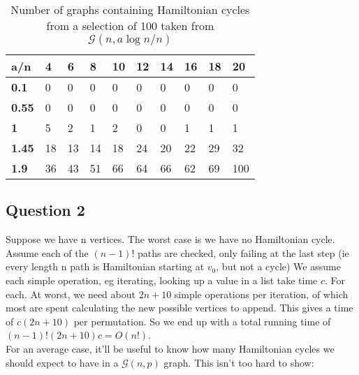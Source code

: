 \documentclass[10pt,a4paper]{report}
\begin{document}
\begin{table}[ht]
\centering
\begin{tabular}{|l|l|l|l|l|l|l|l|l|l|}
\hline
\textbf{a/n}  & \textbf{4} & \textbf{6} & \textbf{8} & \textbf{10} & \textbf{12} & \textbf{14} & \textbf{16} & \textbf{18} & \textbf{20} \\ \hline
\textbf{0.1}  & 0          & 0          & 0          & 0           & 0           & 0           & 0           & 0           & 0           \\ \hline
\textbf{0.55} & 0          & 0          & 0          & 0           & 0           & 0           & 0           & 0           & 0           \\ \hline
\textbf{1}    & 5          & 2          & 1          & 2           & 0           & 0           & 1           & 1           & 1           \\ \hline
\textbf{1.45} & 18         & 13         & 14         & 18          & 24          & 20          & 22          & 29          & 32          \\ \hline
\textbf{1.9}  & 36         & 43         & 51         & 66          & 64          & 66          & 62          & 69          & 100         \\ \hline
\end{tabular}
\caption{Number of graphs containing Hamiltonian cycles from a selection of 100 taken from $
\mathcal{G}(n,a\log{n}/n)$}
\label{tab:my-table}
\end{table}
\newpage
\subsection*{Question 2}
Suppose we have n vertices. The worst case is we have no Hamiltonian cycle. Assume each of the $(n-1)!$ paths are checked, only failing at the last step (ie every length n path is Hamiltonian starting at $v_0$, but not a cycle) We assume each simple operation, eg iterating, looking up a value in a list take time $c$. For each. At worst, we need about $2n+10$ simple operations per iteration, of which most are spent calculating the new possible vertices to append. This gives a time of $c(2n+10)$ per permutation. So we end up with a total running time of $(n-1)!(2n+10)c = O(n!)$.\\

For an average case, it'll be useful to know how many Hamiltonian cycles we should expect to have in a $\mathcal{G}(n,p)$ graph. This isn't too hard to show:
\end{document}
